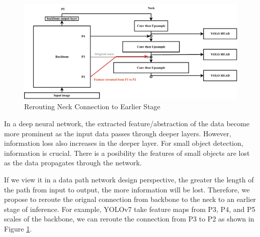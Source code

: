   \begin{figure}[H]
    \centering
    \includegraphics[width=.9\textwidth]{figures/neck-move-back.pdf}
    \caption{Rerouting Neck Connection to Earlier Stage}
    \label{fig:neckmoveback}
  \end{figure}
  In a deep neural network, the extracted feature/abstraction of the data become more prominent
  as the input data passes through deeper layers. However, information loss also increases in the
  deeper layer. For small object detection, information is crucial. There is a posibility the features
  of small objects are lost as the data propagates through the network.
  
  If we view it in a data path network design perspective, the greater the length of the path from input
  to output, the more information will be lost. Therefore, we propose to reroute the orignal connection from
  backbone to the neck to an earlier stage of inference. For example, YOLOv7 take feature maps from P3, P4, and P5
  scales of the backbone, we can reroute the connection from P3 to P2 as shown in Figure \ref{fig:neckmoveback}.
